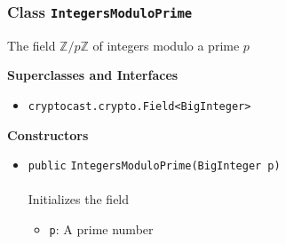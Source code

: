 \subsubsection{Class \lstinline|IntegersModuloPrime|}
The field $\mathbb{Z}/p\mathbb{Z}$ of integers modulo a prime $p$ \\
\noindent\begin{minipage}[t]{5cm}
\vspace{0.3em}
\hspace*{2em}
\vspace{0.3em}
\end{minipage}



\textbf{\sffamily Superclasses and Interfaces}
\begin{itemize}
\item \lstinline|cryptocast.crypto.Field<BigInteger>|
\end{itemize}


\textbf{\sffamily Constructors}
\begin{itemize}
\item \lstinline|public| \lstinline|IntegersModuloPrime|\lstinline|(BigInteger p)|\\ \\[-0.6em]
Initializes the field
\begin{itemize}
\item \lstinline|p|: A prime number
\end{itemize}



\end{itemize}


